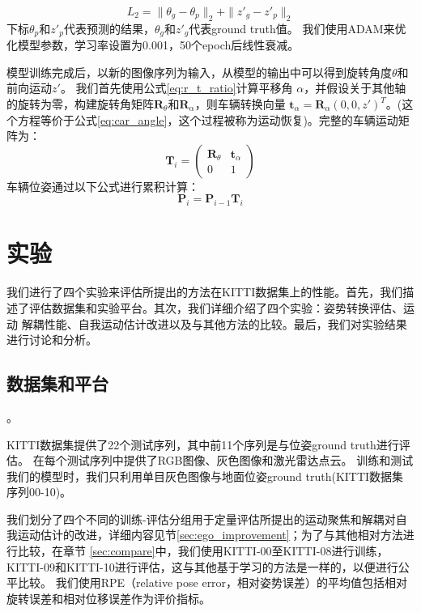 \begin{equation}
    L_2 = \|\theta_g -\theta_p\|_2 +\|z'_g -z'_p \|_2
\end{equation}
下标$\theta_p$和{$z'_p$}代表预测的结果，$\theta_g$和$z'_g$代表ground truth值。
我们使用ADAM\cite{kingma2014adam}来优化模型参数，学习率设置为0.001，50个epoch后线性衰减。%

模型训练完成后，以新的图像序列为输入，从模型的输出中可以得到旋转角度$\theta$和前向运动{$z'$}。
我们首先使用公式\eqref{eq:r_t_ratio}{计算平移角} $\alpha$，并假设关于其他轴的旋转为零，构建旋转角矩阵$\mathbf{R}_\theta$和$\mathbf{R}_\alpha$，则车辆转换向量
{$\mathbf{t}_\alpha=\mathbf{R}_\alpha(0,0,z')^T$}。{(这个方程等价于公式\eqref{eq:car_angle}，这个过程被称为运动恢复)}。完整的车辆运动矩阵为： 
\begin{equation}
    \mathbf{T}_i =\begin{pmatrix} \mathbf{R}_\theta & \mathbf{t}_\alpha\\ 0 & 1  \end{pmatrix} 
    \label{eq:rt_final}
\end{equation}
车辆位姿通过以下公式进行累积计算：
\begin{equation}
    \mathbf{P}_i = \mathbf{P}_{i-1}\mathbf{T}_i
    \label{eq:pose}
\end{equation}

\section{实验}
\label{sec:experiments}


我们进行了四个实验来评估所提出的方法在KITTI数据集\cite{geiger2012kitti}上的性能。首先，我们描述了评估数据集和实验平台。其次，我们详细介绍了四个实验：姿势转换评估、运动
解耦性能、自我运动估计改进以及与其他方法的比较。最后，我们对实验结果进行讨论和分析。

\subsection{数据集和平台}。

KITTI\cite{geiger2012kitti}数据集提供了22个测试序列，其中前11个序列是与位姿ground truth进行评估。 在每个测试序列中提供了{RGB图像、灰色图像和激光雷达点云}。
训练和测试我们的模型时，我们只利用单目灰色图像与地面位姿ground truth{(KITTI数据集序列00-10)}。

我们划分了四个不同的训练-评估分组用于定量评估所提出的运动聚焦和解耦对自我运动估计的改进，详细内容见节\ref{sec:ego_improvement}；为了与其他相对方法进行比较，在章节
\ref{sec:compare}中，我们使用KITTI-00至KITTI-08进行训练，KITTI-09和KITTI-10进行评估，这与其他基于学习的方法是一样的，以便进行公平比较。 
我们使用RPE（relative pose error，相对姿势误差）的平均值包括相对旋转误差和相对位移误差\cite{geiger2012kitti}作为评价指标。

